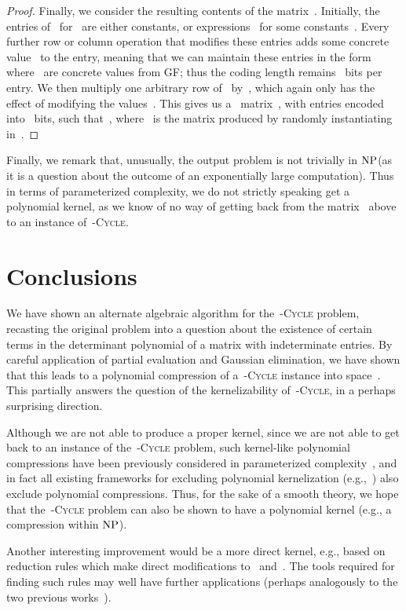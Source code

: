 \documentclass[a4paper,11pt]{article}
\newcommand{\cclass}[1]{\ensuremath{\mbox{\textup{#1}}}\xspace}
\newcommand{\NP}{\cclass{NP}}
\begin{document}
\begin{proof}
Finally, we consider the resulting contents of the matrix~. Initially, the entries
of~ for~ are either constants, or expressions~ for
some constants~.  Every further row or column operation that modifies 
these entries adds some concrete value~ to the entry, meaning that we can maintain
these entries in the form~ where~ are concrete values from
GF; thus the coding length remains~ bits per entry.
We then multiply one arbitrary row of~ by~, which again only has the effect 
of modifying the values~. This gives us a~ matrix~, with entries
encoded into~ bits, such that~, where~ is the
matrix produced by randomly instantiating~ in~. 
\end{proof}

Finally, we remark that, unusually, the output problem is not trivially in \NP (as it is a
question about the outcome of an exponentially large computation). Thus in terms of
parameterized complexity, we do not strictly speaking get a polynomial kernel, as we know
of no way of getting back from the matrix~ above to an instance of~\textsc{-Cycle}.




\section{Conclusions}

We have shown an alternate algebraic algorithm for the~\textsc{-Cycle} problem,
recasting the original problem into a question about the existence of certain terms in the
determinant polynomial of a matrix with indeterminate entries. By careful application of
partial evaluation and Gaussian elimination, we have shown that this leads to a
polynomial compression of a~\textsc{-Cycle} instance into space~.
This partially answers the question of the kernelizability of~\textsc{-Cycle}, in a
perhaps surprising direction. 

Although we are not able to produce a proper kernel, since we are not able to get back to
an instance of the~\textsc{-Cycle} problem, such kernel-like polynomial compressions
have been previously considered in parameterized complexity~\cite{AlonGKSY10}, and in fact
all existing frameworks for excluding polynomial kernelization
(e.g.,~\cite{FortnowS11,Drucker12}) also exclude polynomial compressions. 
Thus, for the sake of a smooth theory, we hope that the~\textsc{-Cycle} problem can
also be shown to have a polynomial kernel (e.g., a compression within \NP). 

Another interesting improvement would be a more direct kernel, e.g., based on reduction
rules which make direct modifications to~ and~. The tools required for finding such
rules may well have further applications (perhaps analogously to the two previous
works~\cite{KratschW12a,KratschW12b}). 
\end{document}
